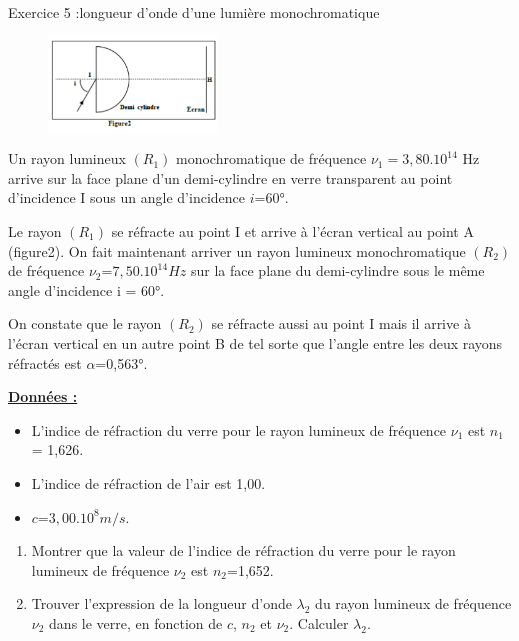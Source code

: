 \documentclass[12pt, french]{article}
\begin{document}
\begin{Box2}{Exercice 5 :longueur d’onde d’une lumière
monochromatique }
\begin{figure}
  \begin{center}
	  \vspace{-0.6cm}
	\includegraphics[width=0.4\textwidth]{./img/ex_5.png}
  \end{center}
\end{figure}

Un rayon lumineux $(R_1)$ monochromatique de fréquence $\nu_1 = 3,80.10^{14}$ Hz arrive sur la face plane d’un
demi-cylindre en verre transparent au point d’incidence I sous un angle d’incidence $i$=60°. 

Le rayon $(R_1)$ se réfracte au point I et arrive à l’écran vertical au point A (figure2).
On fait maintenant arriver un rayon lumineux monochromatique $(R_2)$ de fréquence $\nu_2$=$7,50.10^{14} Hz$
sur la face plane du demi-cylindre sous le même angle d’incidence i = 60°. 

On constate que le rayon $(R_2)$ se réfracte aussi au point I mais il arrive à l’écran vertical en un autre point B de tel sorte que
l’angle entre les deux rayons réfractés est $\alpha$=0,563°.

\underline{\textbf{Données :}}

\begin{itemize}
		\item L’indice de réfraction du verre pour le rayon lumineux de fréquence $\nu_1$ est $n_1$ = 1,626.
		\item  L’indice de réfraction de l’air est 1,00.
		\item  $c$=$3,00.10^8 m/s$.
\end{itemize}

\begin{enumerate}
	\item Montrer que la valeur de l’indice de réfraction du verre pour le rayon lumineux de fréquence $\nu_2$ est $n_2$=1,652.
	\item Trouver l’expression de la longueur d’onde $\lambda_2$ du rayon lumineux de fréquence $\nu_2$ dans le
verre, en fonction de $c$, $n_2$ et $\nu_2$. Calculer $\lambda_2$.
\end{enumerate}
\end{Box2}
\end{document}
